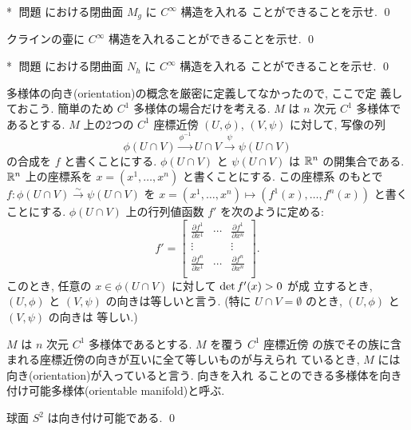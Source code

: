 \documentclass[12pt,twoside]{jarticle}
\def\qstar#1{$\!\!\!$#1$\;$}
\def\R{{\Bbb R}} %
\def\det{\mathop{\text{\rm det}}\nolimits}          %
\def\isoto{\overset\sim\longrightarrow}
\def\pd#1#2{\frac{\partial #1}{\partial #2}}
\begin{document}
\begin{question}\qstar{*}
  問題  における閉曲面 $M_g$ に $C^\infty$ 構造を入れる
  ことができることを示せ. \qed
\end{question}

\begin{question}
  クラインの壷に $C^\infty$ 構造を入れることができることを示せ. \qed
\end{question}

\begin{question}\qstar{*}
  問題  における閉曲面 $N_h$ に $C^\infty$ 構造を入れる
  ことができることを示せ. \qed
\end{question}

\medskip

多様体の向き(orientation)の概念を厳密に定義してなかったので, ここで定
義しておこう. 簡単のため $C^1$ 多様体の場合だけを考える. %
$M$ は $n$ 次元 $C^1$ 多様体であるとする. %
$M$ 上の2つの $C^1$ 座標近傍 $(U,\phi)$, $(V,\psi)$ に対して, 写像の列
\[
  \phi(U \cap V)
  \overset{\phi^{-1}}\longrightarrow
  U \cap V
  \overset{\psi}\longrightarrow
  \psi(U \cap V)
\]
の合成を $f$ と書くことにする. $\phi(U \cap V)$ と $\psi(U \cap V)$ は %
$\R^n$ の開集合である. %
$\R^n$ 上の座標系を $x = (x^1,\dots,x^n)$ と書くことにする. この座標系
のもとで $f: \phi(U \cap V) \isoto \psi(U \cap V)$ を %
$x = (x^1,\dots,x^n) \mapsto (f^1(x),\dots,f^n(x))$ と書くことにする. 
$\phi(U \cap V)$ 上の行列値函数 $f'$ を次のように定める:
\[
  f'
  =
  \begin{bmatrix}
    \pd{f^1}{x^1} & \cdots & \pd{f^1}{x^n} \\
    \vdots        &        & \vdots        \\
    \pd{f^n}{x^1} & \cdots & \pd{f^n}{x^n} \\
  \end{bmatrix}.
\] %
このとき, 任意の $x \in \phi(U \cap V)$ に対して $\det f'(x) > 0$ が成
立するとき, $(U,\phi)$ と $(V,\psi)$ の向きは等しいと言う. %
(特に $U \cap V = \emptyset$ のとき, $(U,\phi)$ と $(V,\psi)$ の向きは
等しい.)

\begin{Definition}
  $M$ は $n$ 次元 $C^1$ 多様体であるとする. $M$ を覆う $C^1$ 座標近傍
  の族でその族に含まれる座標近傍の向きが互いに全て等しいものが与えられ
  ているとき, $M$ には向き(orientation)が入っていると言う. 向きを入れ
  ることのできる多様体を向き付け可能多様体(orientable manifold)と呼ぶ.
\end{Definition}

\begin{question}
  球面 $S^2$ は向き付け可能である. \qed
\end{question}
\end{document}
